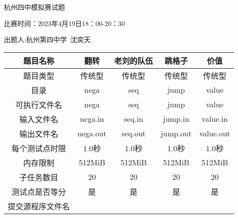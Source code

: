 \documentclass[final,11pt,oneside,UTF8]{report}
\begin{document}
\centerline{\LARGE{杭州四中模拟赛试题}}
\centerline{}
\centerline{\LARGE{比赛时间：2023年4月19日18：00-20：30}}
\centerline{}
\centerline{出题人:杭州第四中学\ 沈奕天}
\centerline{}
\begin{table}[H]
    \centering
    \begin{tabular}{ccccc}
    \hline
    \multicolumn{1}{|c|}{题目名称}    & \multicolumn{1}{c|}{翻转}       & \multicolumn{1}{c|}{老刘的队伍}   & \multicolumn{1}{c|}{跳格子}      & \multicolumn{1}{c|}{价值}        \\ \hline
    \multicolumn{1}{|c|}{题目类型}    & \multicolumn{1}{c|}{传统型}      & \multicolumn{1}{c|}{传统型}     & \multicolumn{1}{c|}{传统型}      & \multicolumn{1}{c|}{传统型}       \\ \hline
    \multicolumn{1}{|c|}{目录}      & \multicolumn{1}{c|}{nega}     & \multicolumn{1}{c|}{seq}     & \multicolumn{1}{c|}{jump}     & \multicolumn{1}{c|}{value}     \\ \hline
    \multicolumn{1}{|c|}{可执行文件名}  & \multicolumn{1}{c|}{nega}     & \multicolumn{1}{c|}{seq}     & \multicolumn{1}{c|}{jump}     & \multicolumn{1}{c|}{value}     \\ \hline
    \multicolumn{1}{|c|}{输入文件名}   & \multicolumn{1}{c|}{nega.in}  & \multicolumn{1}{c|}{seq.in}  & \multicolumn{1}{c|}{jump.in}  & \multicolumn{1}{c|}{value.in}  \\ \hline
    \multicolumn{1}{|c|}{输出文件名}   & \multicolumn{1}{c|}{nega.out} & \multicolumn{1}{c|}{seq.out} & \multicolumn{1}{c|}{jump.out} & \multicolumn{1}{c|}{value.out} \\ \hline
    \multicolumn{1}{|c|}{每个测试点时限} & \multicolumn{1}{c|}{1.0秒}     & \multicolumn{1}{c|}{1.0秒}    & \multicolumn{1}{c|}{1.0秒}     & \multicolumn{1}{c|}{1.0秒}      \\ \hline
    \multicolumn{1}{|c|}{内存限制}    & \multicolumn{1}{c|}{512MiB}   & \multicolumn{1}{c|}{512MiB}  & \multicolumn{1}{c|}{512MiB}   & \multicolumn{1}{c|}{512MiB}    \\ \hline
    \multicolumn{1}{|c|}{子任务数目}   & \multicolumn{1}{c|}{20}       & \multicolumn{1}{c|}{20}      & \multicolumn{1}{c|}{20}       & \multicolumn{1}{c|}{20}        \\ \hline
    \multicolumn{1}{|c|}{测试点是否等分} & \multicolumn{1}{c|}{是}        & \multicolumn{1}{c|}{是}       & \multicolumn{1}{c|}{是}        & \multicolumn{1}{c|}{是}         \\ \hline
    \multicolumn{1}{l}{提交源程序文件名}  &                               &                              &                               &                                \\ \hline

\end{tabular}
\end{table}
\end{document}
